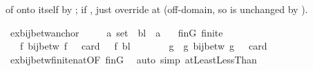 \begin{isabellebody}
\begin{isamarkuptext}
   of  onto itself by
  ; if , just override
   at  (off-domain, so  is
  unchanged by ).%
\end{isamarkuptext}\isamarkuptrue%
\isamarkupfalse%
\ ex{\isacharunderscore}{\kern0pt}bij{\isacharunderscore}{\kern0pt}betw{\isacharunderscore}{\kern0pt}anchor{\isacharcolon}{\kern0pt}\isanewline
\ \ \ {\isasymGamma}\ {\isacharcolon}{\kern0pt}{\isacharcolon}{\kern0pt}\ {\isachardoublequoteopen}{\isacharprime}{\kern0pt}a\ set{\isachardoublequoteclose}\ \ bl\ {\isacharcolon}{\kern0pt}{\isacharcolon}{\kern0pt}\ {\isacharprime}{\kern0pt}a\isanewline
\ \ \ finG{\isacharcolon}{\kern0pt}\ {\isachardoublequoteopen}finite\ {\isasymGamma}{\isachardoublequoteclose}\isanewline
\ \ \ {\isachardoublequoteopen}{\isasymexists}f{\isachardot}{\kern0pt}\ bij{\isacharunderscore}{\kern0pt}betw\ f\ {\isasymGamma}\ {\isacharbraceleft}{\kern0pt}{\isachardot}{\kern0pt}{\isachardot}{\kern0pt}{\isacharless}{\kern0pt}\ card\ {\isasymGamma}{\isacharbraceright}{\kern0pt}\ {\isasymand}\ f\ bl\ {\isacharequal}{\kern0pt}\ {}{\isachardoublequoteclose}\isanewline
%
\isadelimproof
%
\endisadelimproof
%
\isatagproof
{}\isamarkupfalse%
\ {\isacharminus}{\kern0pt}\isanewline
\ \ \isamarkupfalse%
\ g\ \ g{\isacharcolon}{\kern0pt}\ {\isachardoublequoteopen}bij{\isacharunderscore}{\kern0pt}betw\ g\ {\isasymGamma}\ {\isacharbraceleft}{\kern0pt}{\isachardot}{\kern0pt}{\isachardot}{\kern0pt}{\isacharless}{\kern0pt}\ card\ {\isasymGamma}{\isacharbraceright}{\kern0pt}{\isachardoublequoteclose}\isanewline
\ \ \ \ \isamarkupfalse%
\ ex{\isacharunderscore}{\kern0pt}bij{\isacharunderscore}{\kern0pt}betw{\isacharunderscore}{\kern0pt}finite{\isacharunderscore}{\kern0pt}nat{\isacharbrackleft}{\kern0pt}OF\ finG{\isacharbrackright}{\kern0pt}\ \isamarkupfalse%
\ {\isacharparenleft}{\kern0pt}auto\ simp{\isacharcolon}{\kern0pt}\ atLeast{}LessThan{\isacharparenright}{\kern0pt}\isanewline
\ \ \isamarkupfalse%

\end{isabellebody}
